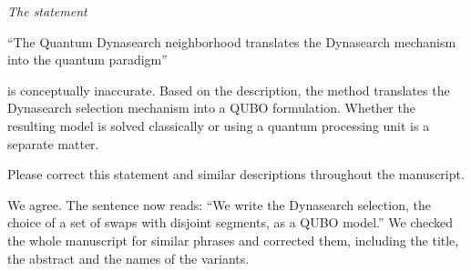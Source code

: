 \documentclass[12pt]{article}
\newenvironment{rc}[1]{\par\medskip\noindent\itshape\renewcommand{\emph}[1]{\textbf{##1}}\ignorespaces}{\par}
\newcommand{\answer}[1]{\par\smallskip\noindent #1\par}
\begin{document}
\begin{rc}{R2 3.4 --- ``Quantum Dynasearch'' and the quantum paradigm}
The statement

``The Quantum Dynasearch neighborhood translates the Dynasearch mechanism into the quantum paradigm''

is conceptually inaccurate. Based on the description, the method translates the Dynasearch selection mechanism into a QUBO formulation. Whether the resulting model is solved classically or using a quantum processing unit is a separate matter.

Please correct this statement and similar descriptions throughout the manuscript.
\end{rc}
\answer{We agree. The sentence now reads: ``We write the Dynasearch selection, the choice of a set of swaps with disjoint segments, as a QUBO model.'' We checked the whole manuscript for similar phrases and corrected them, including the title, the abstract and the names of the variants.}
\end{document}

